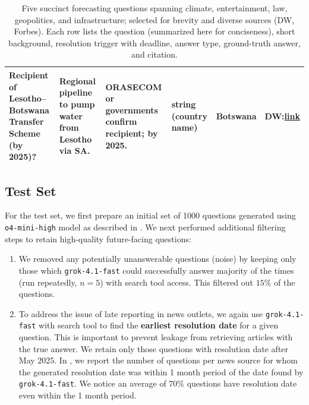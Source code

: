 \documentclass{article} %
\begin{document}
\begin{table}[h]
\begin{tabularx}{\textwidth}{L L L L L L}
\midrule
Recipient of Lesotho--Botswana Transfer Scheme (by 2025)? & Regional pipeline to pump water from Lesotho via SA. & ORASECOM or governments confirm recipient; by 2025. & string (country name) & Botswana & DW:\newline \href{https://www.dw.com/en/lesotho-urged-to-compensate-villagers-for-water-projects/a-69352942}{link} \\
\bottomrule
\end{tabularx}
\caption{Five succinct forecasting questions spanning climate, entertainment, law, geopolitics, and infrastructure; selected for brevity and diverse sources (DW, Forbes). Each row lists the question (summarized here for conciseness), short background, resolution trigger with deadline, answer type, ground-truth answer, and citation.}
\label{tab:succinct_forecasting_questions_v2}
\end{table}



\subsection{Test Set}
\label{sec:test_set_details}

For the test set, we first prepare an initial set of 1000 questions generated using \texttt{o4-mini-high} model as described in . We next performed additional filtering steps to retain high-quality future-facing questions: 
\begin{enumerate}
    \item We removed any potentially unanswerable questions (noise) by keeping only those which \texttt{grok-4.1-fast} could successfully answer majority of the times (run repeatedly, $n=5$) with search tool access. This filtered out $15\%$ of the questions.
    \item To address the issue of late reporting in news outlets, we again use \texttt{grok-4.1-fast} with search tool to find the \textbf{earliest resolution date} for a given question. This is important to prevent leakage from retrieving articles with the true answer. We retain only those questions with resolution date after May 2025. In , we report the number of questions per news source for whom the generated resolution date was within 1 month period of the date found by \texttt{grok-4.1-fast}. We notice an average of $70\%$ questions have resolution date even within the 1 month period. %
\end{enumerate} 
\end{document}
